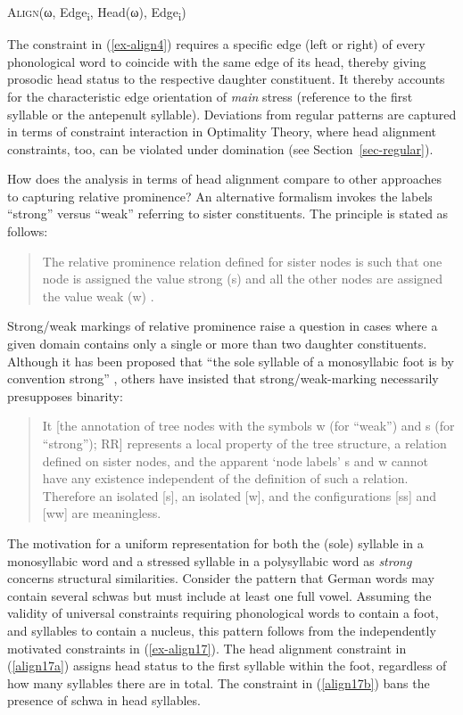 \documentclass[output=paper
 ,nobabel
 ,draftmode
 ,colorlinks, citecolor=brown
]{langscibook}
\begin{document}
\ea\label{ex-align4}
\textsc{Align}(ω, Edge\textsubscript{i}, Head(ω), Edge\textsubscript{i})
\z

\noindent
The constraint in (\ref{ex-align4}) requires a specific edge (left or right) of every phonological
word to coincide with the same edge of its head, thereby giving prosodic head status to the
respective daughter constituent. It thereby accounts for the characteristic edge orientation of
\emph{main} stress (\eg reference to the first syllable or the antepenult syllable). Deviations from regular patterns are captured in terms of constraint interaction in Optimality Theory, where head alignment constraints, too, can be violated under domination (see Section~\ref{sec-regular}).  

How does the analysis in terms of head alignment compare to other approaches to capturing relative prominence? An alternative formalism invokes the labels ``strong'' versus ``weak'' referring to sister constituents. The principle is stated as follows:

\begin{quote}
The relative prominence relation defined for sister nodes is such that one node is assigned the value strong (s) and all the other nodes are assigned the value weak (w) \citep[7]{NesporVogel2007}. 
\end{quote}

\noindent
Strong/weak markings of relative prominence raise a question in cases where a given domain contains only a single or more than two daughter constituents. Although it has been proposed that ``the sole syllable of a monosyllabic foot is by convention strong'' \citep[15]{Selkirk1986}, others have insisted that strong/weak-marking necessarily presupposes binarity: 

\begin{quote}
It [the annotation of tree nodes with the symbols w (for ``weak'') and s (for ``strong''); RR] represents a local property of the tree structure, a relation defined on sister nodes, and the apparent `node labels' s and w cannot have any existence independent of the definition of such a relation. Therefore an isolated [s], an isolated [w], and the configurations [ss] and [ww] are meaningless. \citep[256]{LibermanPrince1977}
\end{quote}

\noindent
The motivation for a uniform representation for both the (sole) syllable in a monosyllabic word and a stressed syllable in a polysyllabic word as \emph{strong} concerns structural similarities. Consider the pattern that German words may contain several schwas but must include at least one full vowel. Assuming the validity of universal constraints requiring phonological words to contain a foot, and syllables to contain a nucleus, this pattern follows from the independently motivated constraints in (\ref{ex-align17}). The head alignment constraint in (\ref{align17a}) assigns head status to the first syllable within the foot, regardless of how many syllables there are in total. The constraint in (\ref{align17b}) bans the presence of schwa in head syllables. 
\end{document}
